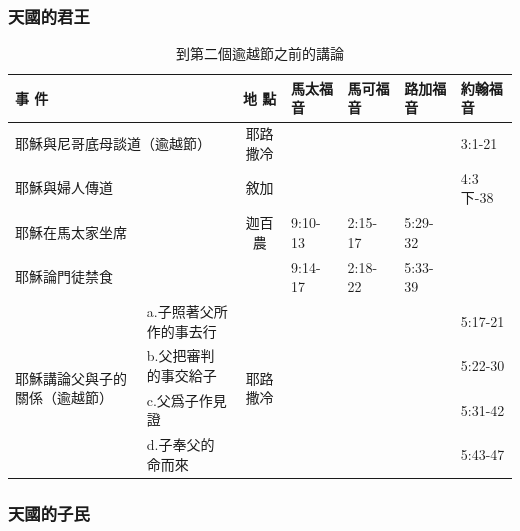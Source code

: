 \subsubsection{天國的君王}
 \begin{table}[H]
  \centering
    \begin{tabular}{|p{3.93em}|p{11.53em}|c|p{4.045em}|p{4.045em}|p{4.045em}|p{4.045em}|}    \toprule
    \multicolumn{2}{|p{16.5em}|}{事 件} & 地 點 & 馬太福音 & 馬可福音 & 路加福音 & 約翰福音 \\    \midrule
    \multicolumn{2}{|p{13.5em}|}{耶穌與尼哥底母談道（逾越節）} & 耶路撒冷 &       &       &       & 3:1-21 \\  \midrule   
 \multicolumn{2}{|p{11.5em}|}{耶穌與婦人傳道} & 敘加 &       &       &       & 4:3下-38 \\ \midrule
 \multicolumn{2}{|p{11.5em}|}{耶穌在馬太家坐席} & \multirow{1}{*}{迦百農} & 9:10-13 &2:15-17& 5:29-32 &  \\\midrule
 \multicolumn{2}{|p{16.5em}|}{耶穌論門徒禁食} &       & 9:14-17 & 2:18-22 & 5:33-39 &  \\ \midrule
    \multicolumn{1}{|l|}{\multirow{4}{*}{\parbox{0.08\textwidth}{耶穌講論父與子的關係（逾越節）}}} & \multicolumn{1}{p{12.715em}|}{a.子照著父所作的事去行} & \multirow{4}[8]{*}{耶路撒冷} & \multicolumn{1}{r|}{} & \multicolumn{1}{r|}{} &       & \multicolumn{1}{p{5.93em}|}{5:17-21 } \\
\cmidrule{2-2}\cmidrule{4-7}    \multicolumn{1}{|l|}{} & \multicolumn{1}{p{12.715em}|}{b.父把審判的事交給子} & \multicolumn{1}{c|}{} & \multicolumn{1}{r|}{} & \multicolumn{1}{r|}{} &       & \multicolumn{1}{p{5.93em}|}{5:22-30 } \\
\cmidrule{2-2}\cmidrule{4-7}    \multicolumn{1}{|l|}{} & \multicolumn{1}{p{12.715em}|}{c.父爲子作見證} & \multicolumn{1}{c|}{} & \multicolumn{1}{r|}{} & \multicolumn{1}{r|}{} &       & \multicolumn{1}{p{5.93em}|}{5:31-42} \\
\cmidrule{2-2}\cmidrule{4-7}    \multicolumn{1}{|l|}{} & \multicolumn{1}{p{12.715em}|}{d.子奉父的命而來} & \multicolumn{1}{c|}{} & \multicolumn{1}{r|}{} & \multicolumn{1}{r|}{} &       & \multicolumn{1}{p{5.93em}|}{5:43-47} \\    \midrule
    \bottomrule
    \end{tabular}%
  \label{tab:addlabel}%
    \caption{到第二個逾越節之前的講論}
\end{table}%

\subsubsection{天國的子民}

